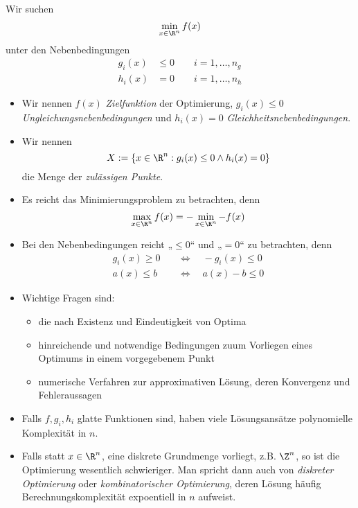 \documentclass[11pt]{scrbook}
\begin{document}
Wir suchen
\[
	\min_{x \in \R^n} f(x)
\]
unter den Nebenbedingungen
\begin{align*}
	g_i(x) &\le 0 \qquad i=1,\dotsc, n_g \\
	h_i(x) &= 0 \qquad i = 1,\dotsc, n_h
\end{align*}
\begin{itemize}
	\item
		Wir nennen $f(x)$ \emph{Zielfunktion} der Optimierung, $g_i(x) \le 0$ \emph{Ungleichungsnebenbedingungen} und $h_i(x)=0$ \emph{Gleichheitsnebenbedingungen}.
	\item
		Wir nennen
		\[
			X := \{x\in \R^n : g_i(x) \le 0 \land h_i(x) = 0 \}
		\]
		die Menge der \emph{zulässigen Punkte}.
	\item
		Es reicht das Minimierungsproblem zu betrachten, denn
		\[
			\max_{x\in \R^n} f(x) = -\min_{x\in\R^n} -f(x)
		\]
	\item
		Bei den Nebenbedingungen reicht „$\le 0$“ und „$= 0$“ zu betrachten, denn
		\begin{align*}
			g_i(x) \ge 0 \quad &\iff \quad -g_i(x) \le 0 \\
			a(x) \le b \quad &\iff \quad a(x) - b \le 0
		\end{align*}
	\item
		Wichtige Fragen sind:
		\begin{itemize}
			\item
				die nach Existenz und Eindeutigkeit von Optima 
			\item
				hinreichende und notwendige Bedingungen zuum Vorliegen eines Optimums in einem vorgegebenem Punkt
			\item
				numerische Verfahren zur approximativen Lösung, deren Konvergenz und Fehleraussagen
		\end{itemize}
	\item
		Falls $f,g_i,h_i$ glatte Funktionen sind, haben viele Lösungsansätze polynomielle Komplexität in $n$.
	\item
		Falls statt $x\in\R^n$, eine diskrete Grundmenge vorliegt, z.B. $\Z^n$, so ist die Optimierung wesentlich schwieriger.
		Man spricht dann auch von \emph{diskreter Optimierung} oder \emph{kombinatorischer Optimierung}, deren Lösung häufig Berechnungskomplexität expoentiell in $n$ aufweist.
\end{itemize}
\end{document}
